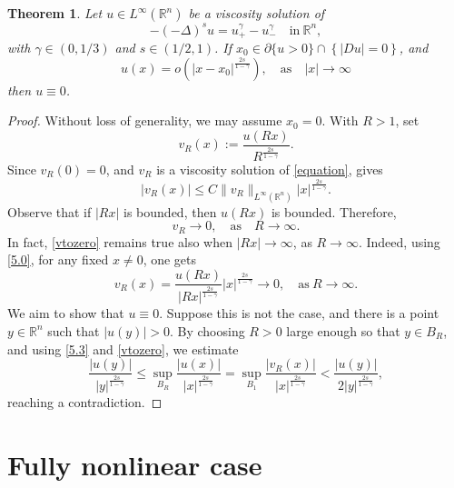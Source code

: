 \documentclass[11pt,reqno]{amsart}
\newtheorem{theorem}{Theorem}
\numberwithin{equation}{section}
\numberwithin{theorem}{section}
\numberwithin{lemma}{section}
\numberwithin{corollary}{section}
\numberwithin{remark}{section}
\numberwithin{proposition}{section}
\numberwithin{definition}{section}
\newcommand{\R}{\mathbb{R}}
\begin{document}
\begin{theorem}
    Let $u\in L^\infty(\R^n)$ be a viscosity solution of 
    \begin{equation*}\label{entiresolution}
   -(-\Delta)^su=u_+^\gamma-u_-^\gamma \quad \textrm{in} \ \R^n,
\end{equation*}    
    with $\gamma\in\left(0,1/3\right)$ and $s\in\left(1/2,1\right)$. If $x_0\in\partial\{u>0\}\cap\left\{|Du|=0\right\}$, and 
    \begin{equation}\label{5.0}
        u(x)=o\left(|x-x_0|^{\frac{2s}{1-\gamma}}\right),\quad \textrm{as}\quad |x|\rightarrow \infty
    \end{equation}
    then $u\equiv0$.
\end{theorem}

\begin{proof}
    Without loss of generality, we may assume $x_0=0$. With $R>1$, set
    $$
    v_R(x):=\frac{u(Rx)}{R^\frac{2s}{1-\gamma}}.
    $$    
    Since $v_R(0)=0$, and $v_R$ is a viscosity solution of \eqref{equation},  gives
    \begin{equation}\label{5.3}
        |v_R(x)|\le C\|v_R\|_{L^\infty(\R^n)}|x|^{\frac{2s}{1-\gamma}}.
    \end{equation}    
    Observe that if $|Rx|$ is bounded, then $u(Rx)$ is bounded. Therefore, 
    \begin{equation}\label{vtozero}
        v_R \longrightarrow 0,\quad \textrm{as}\quad R\to\infty.
    \end{equation}
    In fact, \eqref{vtozero} remains true also when $|Rx|\to\infty$, as $R\to\infty$. Indeed, using \eqref{5.0}, for any fixed $x\neq0$, one gets
    $$
    v_R(x)=\frac{u(Rx)}{|Rx|^{\frac{2s}{1-\gamma}}}|x|^{\frac{2s}{1-\gamma}} \longrightarrow 0,\quad \textrm{as}\ R\to\infty.
    $$    
    We aim to show that $u\equiv0$. Suppose this is not the case, and there is a point $y\in\R^n$ such that $|u(y)|>0$. By choosing $R>0$ large enough so that $y\in B_R$, and using \eqref{5.3} and \eqref{vtozero}, we estimate
    $$
    \frac{|u(y)|}{|y|^\frac{2s}{1-\gamma}}\le\sup_{B_R}\frac{|u(x)|}{|x|^\frac{2s}{1-\gamma}}=\sup_{B_1}\frac{|v_R(x)|}{|x|^\frac{2s}{1-\gamma}}<\frac{|u(y)|}{2|y|^\frac{2s}{1-\gamma}},
    $$    
    reaching a contradiction.    
\end{proof}

\medskip

\section{Fully nonlinear case}\label{s6}
\end{document}

